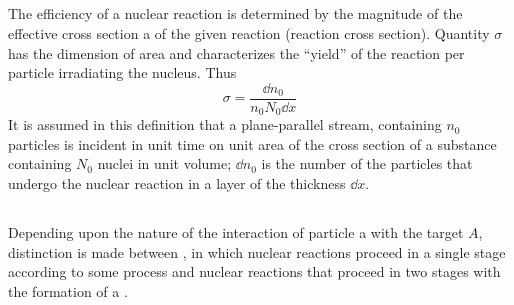 \subsection{}\label{42.9.3} The efficiency of a nuclear reaction is determined by the magnitude of the effective cross section a of the given reaction (reaction cross section). Quantity $\sigma$ has the dimension of area and characterizes the ``yield'' of the reaction per particle
irradiating the nucleus. Thus
\begin{equation*}%
\sigma = \frac{\dd n_{0}}{n_{0}N_{0} \dd x} 
\end{equation*}
It is assumed in this definition that a plane-parallel stream, containing $n_{0}$ particles is incident in unit time on unit area of the cross section of a substance containing $N_{0}$ nuclei in unit volume; $\dd n_{0}$ is the number of the particles that undergo the nuclear reaction in a layer of the thickness $\dd x$.

\subsection{}\label{42.9.4} Depending upon the nature of the interaction of particle a with the target $A$, distinction is made between , in which nuclear reactions proceed in a single stage according to some process  and nuclear reactions that proceed
in two stages with the formation of a .

